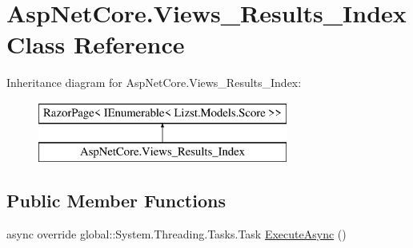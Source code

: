 \hypertarget{class_asp_net_core_1_1_views___results___index}{}\section{Asp\+Net\+Core.\+Views\+\_\+\+Results\+\_\+\+Index Class Reference}
\label{class_asp_net_core_1_1_views___results___index}
Inheritance diagram for Asp\+Net\+Core.\+Views\+\_\+\+Results\+\_\+\+Index\+:\begin{figure}[H]
\begin{center}
\leavevmode
\includegraphics[height=2.000000cm]{class_asp_net_core_1_1_views___results___index}
\end{center}
\end{figure}
\subsection*{Public Member Functions}
\begin{DoxyCompactItemize}
\item 
async override global\+::\+System.\+Threading.\+Tasks.\+Task \mbox{\hyperlink{class_asp_net_core_1_1_views___results___index_ac6216b70dd3eb7a02b5537f19fec208f}{Execute\+Async}} ()
\end{DoxyCompactItemize}
